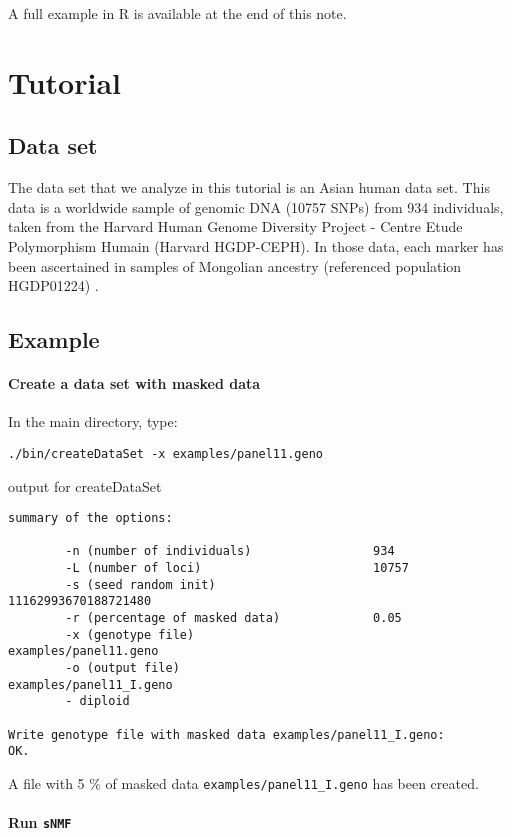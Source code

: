 \documentclass[10pt,a4paper]{article}
\begin{document}
\noindent
A full example in R is available at the end of this note.



\section{Tutorial}

\subsection{Data set}
The data set that we analyze in this tutorial is an Asian human data set.
This data is a worldwide sample of genomic DNA (10757 SNPs) from 934 individuals,
taken from the Harvard Human Genome Diversity Project - Centre
Etude Polymorphism Humain (Harvard HGDP-CEPH). 
In those data, each marker has been ascertained in samples of Mongolian
ancestry (referenced population HGDP01224) \cite{Patterson_2012}. 

\subsection{Example}
\paragraph{Create a data set with masked data}

In the main directory, type:
\begin{Verbatim}[frame=single]
./bin/createDataSet -x examples/panel11.geno
\end{Verbatim}
\noindent
output for createDataSet
\begin{Verbatim}[frame=single]
summary of the options:

        -n (number of individuals)                 934
        -L (number of loci)                        10757
        -s (seed random init)                      11162993670188721480
        -r (percentage of masked data)             0.05
        -x (genotype file)                         examples/panel11.geno
        -o (output file)                           examples/panel11_I.geno
        - diploid

Write genotype file with masked data examples/panel11_I.geno:		OK.
\end{Verbatim}
\noindent
A file with 5 \% of masked data \verb|examples/panel11_I.geno| has been created.

\paragraph{Run {\tt sNMF}}
\end{document}
